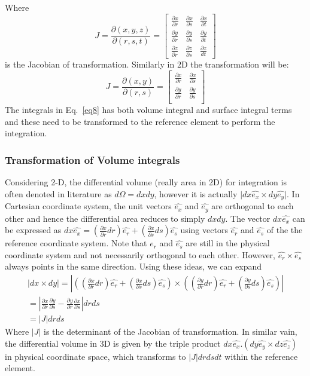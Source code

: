 \documentclass[11pt]{article}
\begin{document}
Where
\begin{equation}
  J=\frac{\partial(x,y,z)}{\partial(r,s,t)} =
  \begin{bmatrix}
  \frac{\partial x}{\partial r} & \frac{\partial x}{\partial s} & \frac{\partial x}{\partial t}\\
  \frac{\partial y}{\partial r} & \frac{\partial y}{\partial s} & \frac{\partial y}{\partial t}\\
  \frac{\partial z}{\partial r} & \frac{\partial z}{\partial s} & \frac{\partial z}{dt}
\end{bmatrix}
\end{equation}
is the Jacobian of transformation. Similarly in 2D the transformation will be:
\begin{equation}
  J=\frac{\partial(x,y)}{\partial(r,s)} =
  \begin{bmatrix}
  \frac{\partial x}{\partial r} & \frac{\partial x}{\partial s}  \\
  \frac{\partial y}{\partial r} & \frac{\partial y}{\partial s}  \\
\end{bmatrix}
\end{equation}
The integrals in Eq.~\ref{eq8} has both volume integral and surface integral terms
and these need to be transformed to the reference element to perform the integration.
\subsubsection{Transformation of Volume integrals}
Considering 2-D, the differential volume (really area in 2D)
for integration is often denoted in literature as
$d\Omega = dxdy$, however it is actually $\vert dx \hat{e_x} \times dy\hat{e_y} \vert$.
In Cartesian coordinate system,  the unit vectors $\hat{e_x}$ and $\hat{e_y}$
are orthogonal to each other and hence the differential area reduces to simply $dxdy$.
The vector $dx \hat{e_x}$ can be expressed as
$dx \hat{e_x} = (\frac{\partial x}{\partial r} dr)\hat{e_r} +  (\frac{\partial x}{\partial s} ds) \hat{e_s}$ using
vectors $\hat{e_r}$ and $\hat{e_s}$ of the the reference coordinate system. Note that
$\hat{e_r}$ and $\hat{e_s}$ are still in the physical coordinate system and not necessarily
orthogonal to each other.  However, $\hat{e_r} \times \hat{e_s}$ always points in the same
direction. Using these ideas, we can expand
\begin{eqnarray}
  \vert dx \times dy \vert = \left \vert \left((\frac{\partial x}{\partial r}dr)\hat{e_r}+(\frac{\partial x}{\partial s}ds)\hat{e_s}\right) \times \left((\frac{\partial y}{\partial r}dr)\hat{e_r}+(\frac{\partial y}{\partial s}ds)\hat{e_s} \right )\right \vert \\ = \left \vert \frac{\partial x}{\partial r}\frac{\partial y}{\partial s} - \frac{\partial y}{\partial r}\frac{\partial x}{\partial s} \right \vert drds\\
  = |J|drds
\end{eqnarray}
Where $|J|$ is the determinant of the Jacobian of transformation.
In similar vain, the differential volume in 3D is given by the triple product 
$dx\hat{e_x}.(dy\hat{e_y} \times dz\hat{e_z})$ in physical coordinate space,
which transforms to $|J|drdsdt$ within the reference element.
\end{document}

